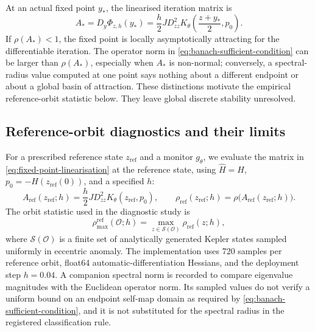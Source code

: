 \documentclass[final,3p,times]{elsarticle}
\begin{document}
At an actual fixed point $y_*$, the linearised iteration matrix is
\begin{equation}
 A_* = D_y\Phi_{z,h}(y_*)
     =\frac{h}{2}J D^2_{zz}K_\theta
       \!\left(\frac{z+y_*}{2},p_0\right).
 \label{eq:fixed-point-linearisation}
\end{equation}
If $\rho(A_*)<1$, the fixed point is locally asymptotically attracting for
the differentiable iteration. The operator norm in
\eqref{eq:banach-sufficient-condition} can be larger than $\rho(A_*)$,
especially when $A_*$ is non-normal; conversely, a spectral-radius value
computed at one point says nothing about a different endpoint or about a
global basin of attraction. These distinctions motivate the empirical
reference-orbit statistic below. They leave global discrete stability
unresolved.


\subsection{Reference-orbit diagnostics and their limits}
\label{sec:reference-diagnostic}

For a prescribed reference state $z_{\mathrm{ref}}$ and a monitor $g_\theta$,
we evaluate the matrix in \eqref{eq:fixed-point-linearisation} at the
reference state, using $\widehat H=H$, $p_0=-H(z_{\mathrm{ref}}(0))$,
and a specified $h$:
\begin{equation}
 A_{\mathrm{ref}}(z_{\mathrm{ref}};h)
 =\frac{h}{2}J D^2_{zz}K_\theta(z_{\mathrm{ref}},p_0),
 \qquad
 \rho_{\mathrm{ref}}(z_{\mathrm{ref}};h)
 =\rho\bigl(A_{\mathrm{ref}}(z_{\mathrm{ref}};h)\bigr).
 \label{eq:reference-rho}
\end{equation}
The orbit statistic used in the diagnostic study is
\begin{equation}
 \rho_{\max}^{\mathrm{ref}}(\mathcal O;h)
 =\max_{z\in\mathcal S(\mathcal O)}
       \rho_{\mathrm{ref}}(z;h),
 \label{eq:reference-rho-max}
\end{equation}
where $\mathcal S(\mathcal O)$ is a finite set of analytically generated
Kepler states sampled uniformly in eccentric anomaly. The implementation
uses 720 samples per reference orbit, float64 automatic-differentiation
Hessians, and the deployment step $h=0.04$. A companion spectral norm is
recorded to compare eigenvalue magnitudes with the Euclidean operator norm.
Its sampled values do not verify a uniform bound on an endpoint self-map
domain as required by \eqref{eq:banach-sufficient-condition}, and it is not
substituted for the spectral radius in the registered classification rule.
\end{document}
